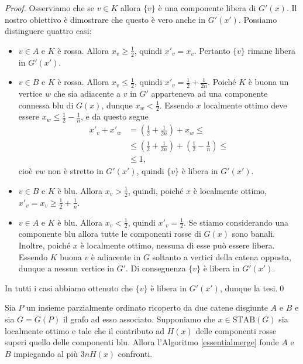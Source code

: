 \begin{proof}
	Osserviamo che se \(v\in K\) allora \(\{v\}\) \`e una componente libera di \(G'(x)\). Il nostro obiettivo \`e dimostrare che questo \`e vero anche in \(G'(x')\). Possiamo distinguere quattro casi: 
	\begin{itemize}
		\item \(v\in A\) e \(K\) \`e rossa. Allora \(x_v\ge\frac{1}{2}\), quindi \(x'_v=x_v\). Pertanto \(\{v\}\) rimane libera in \(G'(x')\). 
		\item \(v\in B\) e \(K\) \`e rossa. Allora \(x_v\le\frac{1}{2}\), quindi \(x'_v=\frac{1}{2}+\frac{1}{2n}\). Poich\'e \(K\) \`e buona un vertice \(w\) che sia adiacente a \(v\) in \(G'\) apparteneva ad una componente connessa blu di \(G(x)\), dunque \(x_w<\frac{1}{2}\). Essendo \(x\) localmente ottimo deve essere \(x_w\le\frac{1}{2}-\frac{1}{n}\), e da questo segue 
		\begin{align}
			x'_v+x'_w &= (\frac{1}{2} + \frac{1}{2n}) + x_w \le \nonumber \\
			&\le (\frac{1}{2} + \frac{1}{2n}) + (\frac{1}{2} - \frac{1}{n}) \le \nonumber \\
			&\le 1\text{,} \nonumber 
		\end{align}
		cio\`e \(vw\) non \`e stretto in \(G'(x')\), quindi \(\{v\}\) \`e libera in \(G'(x')\). 
		\item \(v\in B\) e \(K\) \`e blu. Allora \(x_v>\frac{1}{2}\), quindi, poich\'e \(x\) \`e localmente ottimo, \(x'_v=x_v\ge\frac{1}{2}+\frac{1}{n}\). 
		\item \(v\in A\) e \(K\) \`e blu. Allora \(x_v<\frac{1}{2}\), quindi \(x'_v=\frac{1}{2}\). Se stiamo considerando una componente blu allora tutte le componenti rosse di \(G(x)\) sono banali. Inoltre, poich\'e \(x\) \`e localmente ottimo, nessuna di esse pu\`o essere libera. Essendo \(K\) buona \(v\) \`e adiacente in \(G\) soltanto a vertici della catena opposta, dunque a nessun vertice in \(G'\). Di conseguenza \(\{v\}\) \`e libera in \(G'(x')\). 
	\end{itemize}
	In tutti i casi abbiamo ottenuto che \(\{v\}\) è libera in \(G'(x')\), dunque la tesi.\qed 
\end{proof}
\begin{lemma}
	\label{finallemma} Sia \(P\) un insieme parzialmente ordinato ricoperto da due catene disgiunte \(A\) e \(B\) e sia \(G=\overline{G}(P)\) il grafo ad esso associato. Supponiamo che \(x\in\text{STAB}(G)\) sia localmente ottimo e tale che il contributo ad \(H(x)\) delle componenti rosse superi quello delle componenti blu. Allora l'Algoritmo \ref{essentialmerge} fonde \(A\) e \(B\) impiegando al pi\`u \(3nH(x)\) confronti. 
\end{lemma}
